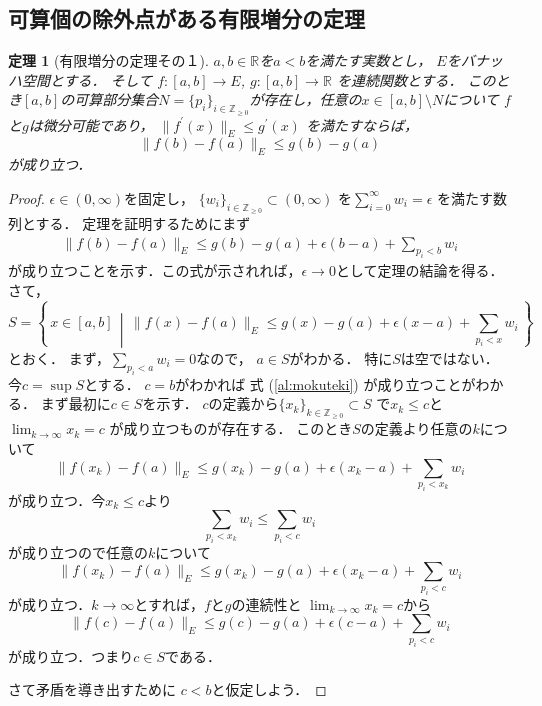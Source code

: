 \documentclass[leqno, a4paper, 12pt]{jsarticle}
\newtheorem{thm}{定理}
\newcommand{\zz}{\mathbb{Z}}
\newcommand{\rr}{\mathbb{R}}
\newcommand{\bibun}[1]{#1^{\prime}}
\begin{document}
\subsection{可算個の除外点がある有限増分の定理}
\begin{thm}[有限増分の定理その１]\label{thm:incre}
$a, b\in \rr$を$a<b$を満たす実数とし，
$E$をバナッハ空間とする．
そして
$f: [a, b]\to E$, 
$g: [a, b]\to \rr$
を連続関数とする．
このとき$[a, b]$の可算部分集合$N=\{p_{i}\}_{i\in \zz_{\ge 0}}$が存在し，任意の$x\in [a, b]\setminus N$について
$f$と$g$は微分可能であり，
$\|\bibun{f}(x)\|_{E}\le \bibun{g}(x)$
を満たすならば，
\[
\|f(b)-f(a)\|_{E}\le g(b)-g(a)
\]
が成り立つ．
\end{thm}
\begin{proof}
$\epsilon\in (0, \infty)$を固定し，
$\{w_{i}\}_{i\in \zz_{\ge 0}}\subset (0, \infty)$
を$\sum_{i=0}^{\infty}w_{i}=\epsilon$
を満たす数列とする．
定理を証明するためにまず
\begin{align}\label{al:mokuteki}
\|f(b)-f(a)\|_{E}\le g(b)-g(a)+\epsilon(b-a)+\sum_{p_{i}<b}w_{i}
\end{align}
が成り立つことを示す．この式が示されれば，$\epsilon\to 0$として定理の結論を得る．
さて，
\[
S=\left\{\, 
x\in [a, b]
\, \middle |\, 
\|f(x)-f(a)\|_{E}\le g(x)-g(a)+\epsilon(x-a)+
\sum_{p_{i}<x}w_{i}
\, \right\}
\]
とおく．
まず，$\sum_{p_{i}<a}w_{i}=0$なので，
$a\in S$がわかる．
特に$S$は空ではない．
今$c=\sup S$とする．
$c=b$がわかれば 式 (\ref{al:mokuteki})
が成り立つことがわかる．
まず最初に$c\in S$を示す．
$c$の定義から$\{x_{k}\}_{k\in \zz_{\ge 0}}\subset S$
で$x_{k}\le c$と$\lim_{k\to \infty}x_{k}=c$
が成り立つものが存在する．
このとき$S$の定義より任意の$k$について
\[
\|f(x_{k})-f(a)\|_{E}\le g(x_{k})-g(a)+\epsilon(x_{k}-a)+
\sum_{p_{i}<x_{k}}w_{i}
\]
が成り立つ．今$x_{k}\le c$より
\[
\sum_{p_{i}<x_{k}}w_{i}\le \sum_{p_{i}<c}w_{i}
\]
が成り立つので任意の$k$について
\[
\|f(x_{k})-f(a)\|_{E}\le g(x_{k})-g(a)+\epsilon(x_{k}-a)+
\sum_{p_{i}<c}w_{i}
\]
が成り立つ．$k\to \infty$とすれば，$f$と$g$の連続性と
$\lim_{k\to \infty}x_{k}=c$から
\[
\|f(c)-f(a)\|_{E}\le g(c)-g(a)+\epsilon(c-a)+
\sum_{p_{i}<c}w_{i}
\]
が成り立つ．つまり$c\in S$である．

さて矛盾を導き出すために
$c<b$と仮定しよう．


\end{proof}
\end{document}
